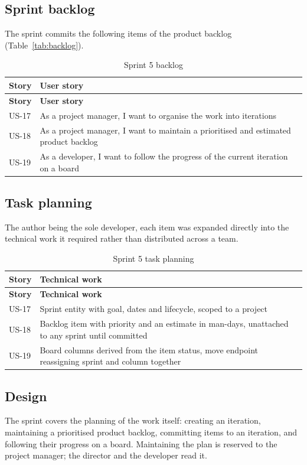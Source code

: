 \subsection{Sprint backlog}
The sprint commits the following items of the product backlog (Table~\ref{tab:backlog}).

\begin{longtable}{|m{1.6cm}|m{12.4cm}|}
\caption{Sprint 5 backlog}\label{tab:sb5}\\
\hline
\textbf{Story} & \textbf{User story} \\
\hline
\endfirsthead
\hline
\textbf{Story} & \textbf{User story} \\
\hline
\endhead
\endfoot
\endlastfoot
\hline
US-17 & As a project manager, I want to organise the work into iterations \\
\hline
US-18 & As a project manager, I want to maintain a prioritised and estimated product backlog \\
\hline
US-19 & As a developer, I want to follow the progress of the current iteration on a board \\
\hline
\end{longtable}

\subsection{Task planning}
The author being the sole developer, each item was expanded directly into the technical work it
required rather than distributed across a team.

\begin{longtable}{|m{1.6cm}|m{12.4cm}|}
\caption{Sprint 5 task planning}\label{tab:tp5}\\
\hline
\textbf{Story} & \textbf{Technical work} \\
\hline
\endfirsthead
\hline
\textbf{Story} & \textbf{Technical work} \\
\hline
\endhead
\endfoot
\endlastfoot
\hline
US-17 & Sprint entity with goal, dates and lifecycle, scoped to a project \\
\hline
US-18 & Backlog item with priority and an estimate in man-days, unattached to any sprint until committed \\
\hline
US-19 & Board columns derived from the item status, move endpoint reassigning sprint and column together \\
\hline
\end{longtable}

\subsection{Design}
The sprint covers the planning of the work itself: creating an iteration, maintaining a prioritised
product backlog, committing items to an iteration, and following their progress on a board.
Maintaining the plan is reserved to the project manager; the director and the developer read it.

